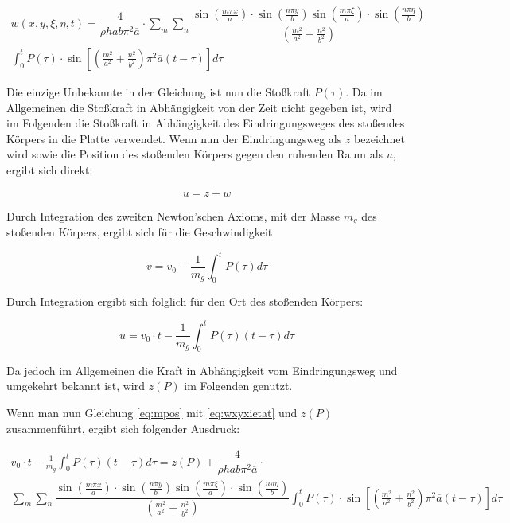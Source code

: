 \begin{multline}
	w(x,y,\xi, \eta, t) = \dfrac{4}{\rho h a b \pi^2 \overline{a}} \cdot \sum_m \sum_n 
	\dfrac{\sin\left(\frac{m \pi x}{a}\right) \cdot \sin\left(\frac{n \pi y}{b}\right) \sin\left(\frac{m \pi \xi}{a}\right) \cdot \sin\left(\frac{n \pi \eta}{b}\right)	}{\left(\frac{m^2}{a^2} + \frac{n^2}{b^2} \right)}  \\
	\int_0^t
	P(\tau)\cdot \sin \left[ \left(\frac{m^2}{a^2} + \frac{n^2}{b^2} \right) \pi^2 \overline{a} (t-\tau)\right] d\tau
	\label{eq:wxyxietat}
\end{multline}


Die einzige Unbekannte in der Gleichung ist nun die Stoßkraft $P(\tau)$. Da im Allgemeinen die Stoßkraft in Abhängigkeit von der Zeit nicht gegeben ist, wird im Folgenden die Stoßkraft in Abhängigkeit des Eindringungsweges des stoßendes Körpers in die Platte verwendet. Wenn nun der Eindringungsweg als $z$ bezeichnet wird sowie die Position des stoßenden Körpers gegen den ruhenden Raum als $u$, ergibt sich direkt:

\begin{equation}
	u = z + w
\end{equation}


Durch Integration des zweiten Newton'schen Axioms, mit der Masse $m_g$ des stoßenden Körpers, ergibt sich für die Geschwindigkeit 

\begin{equation}
	v = v_0 - \frac{1}{m_g} \int_0^t P(\tau) d\tau
	\label{eq:speedEq}
\end{equation}

Durch Integration ergibt sich folglich für den Ort des stoßenden Körpers:

\begin{equation}
	u = v_0 \cdot t - \frac{1}{m_g} \int_0^t P(\tau) (t-\tau) d\tau
	\label{eq:mpos}
\end{equation}


Da jedoch im Allgemeinen die Kraft in Abhängigkeit vom Eindringungsweg und umgekehrt bekannt ist, wird $z(P)$ im Folgenden genutzt.

\newpage

Wenn man nun Gleichung \ref{eq:mpos} mit \ref{eq:wxyxietat} und $z(P)$ zusammenführt, ergibt sich folgender Ausdruck:


\begin{multline}
v_0 \cdot t - \frac{1}{m_g} \int_0^t P(\tau) (t-\tau) d\tau = z(P) + \dfrac{4}{\rho h a b \pi^2 \overline{a}} \cdot  \\  \sum_m \sum_n 
\dfrac{{\sin\left(\frac{m \pi x}{a}\right) \cdot \sin\left(\frac{n \pi y}{b}\right) \sin\left(\frac{m \pi \xi}{a}\right) \cdot \sin\left(\frac{n \pi \eta}{b}\right)	}}{\left(\frac{m^2}{a^2} + \frac{n^2}{b^2} \right)} 
\int_0^t
P(\tau)\cdot \sin \left[ \left(\frac{m^2}{a^2} + \frac{n^2}{b^2} \right) \pi^2 \overline{a} (t-\tau)\right] d\tau
\label{eq:long_solution}
\end{multline}

